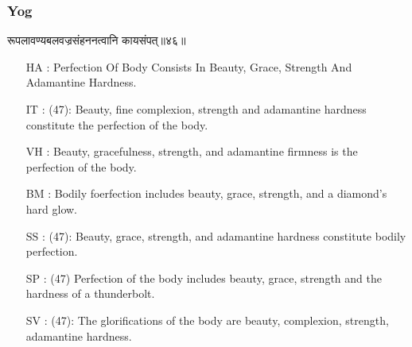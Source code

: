 \begin{frame}[fragile]\frametitle{Yog}
\begin{sanskrit}
रूपलावण्यबलवज्रसंहननत्वानि कायसंपत्॥४६॥
\end{sanskrit}
	\begin{itemize}
	\item [HA]: Perfection Of Body Consists In Beauty, Grace, Strength And Adamantine Hardness.
	\item [IT]: (47): Beauty, fine complexion, strength and adamantine hardness constitute the perfection of the body.
	\item [VH]: Beauty, gracefulness, strength, and adamantine firmness is the perfection of the body.
	\item [BM]: Bodily foerfection includes beauty, grace, strength, and a diamond’s hard glow.
	\item [SS]: (47): Beauty, grace, strength, and adamantine hardness constitute bodily perfection.
	\item [SP]: (47) Perfection of the body includes beauty, grace, strength and the hardness of a thunderbolt.
	\item [SV]: (47): The glorifications of the body are beauty, complexion, strength, adamantine hardness. 
	\end{itemize}
\end{frame}



